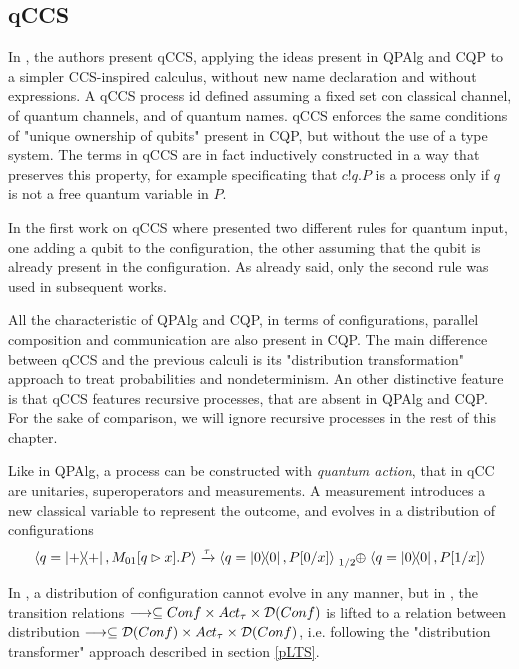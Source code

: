 
\subsection{qCCS}

In \cite{fengProbabilisticBisimulationsQuantum2007}, the authors present qCCS, applying the ideas present in QPAlg and CQP to a simpler CCS-inspired calculus, without new name declaration and without expressions. A qCCS process id defined assuming a fixed set con classical channel, of quantum channels, and of quantum names. qCCS enforces the same conditions of "unique ownership of qubits" present in CQP, but without the use of a type system. The terms in qCCS are in fact inductively constructed in a way that preserves this property, for example specificating that $c!q.P$ is a process only if $q$ is not a free quantum variable in $P$.


In the first work on qCCS where presented two different rules for quantum input, one adding a qubit to the configuration, the other assuming that the qubit is already present in the configuration. As already said, only the second rule was used in subsequent works.


All the characteristic of QPAlg and CQP, in terms of configurations, parallel composition and communication are also present in CQP. The main difference between qCCS and the previous calculi is its "distribution transformation" approach to treat probabilities and nondeterminism. An other distinctive feature is that qCCS features recursive processes, that are absent in QPAlg and CQP. For the sake of comparison, we will ignore recursive processes in the rest of this chapter.


Like in QPAlg, a process can be constructed with \textit{quantum action}, that in qCC  are unitaries, superoperators and measurements. A measurement introduces a new classical variable to represent the outcome, and evolves in a distribution of configurations
\[ \confw{q = \proj{+}, M_{01}[q \rhd x].P} \xrightarrow{\tau} \confw{q = \proj{0}, P[0/x]} \psum{1/2} \confw{q = \proj{0}, P[1/x]} 
\]

In \cite{fengProbabilisticBisimulationsQuantum2007}, a distribution of configuration cannot evolve in any manner, but in \cite{fengBisimulationQuantumProcesses2012, dengOpenBisimulationQuantum2012}, the transition relations $\longrightarrow \subseteq Conf \times Act_\tau \times \mathcal{D}(Conf)$ is lifted to a relation between distribution $\longrightarrow \subseteq \mathcal{D}(Conf) \times Act_\tau \times \mathcal{D}(Conf)$, i.e. following the "distribution transformer" approach described in section \ref{pLTS}.


